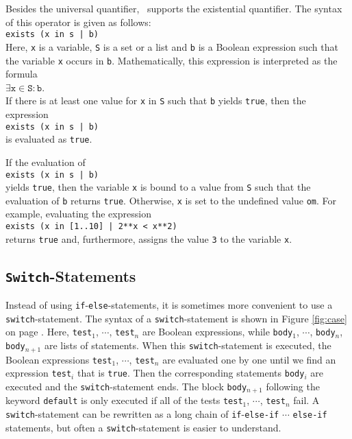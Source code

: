 Besides the universal quantifier, \setlx\ supports the existential quantifier.  The syntax of this operator is
given as follows: 
\\[0.2cm]
\hspace*{1.3cm}
\texttt{exists (x in s | b)}
\\[0.2cm]
Here, \texttt{x} is a variable, \texttt{S} is a set or a list and \texttt{b} is a Boolean expression such
that the variable \texttt{x} occurs in \texttt{b}.  Mathematically, this expression is interpreted
as the formula
\\[0.2cm]
\hspace*{1.3cm}
$\exists \mathtt{x} \in \mathtt{S} : \mathtt{b}$.
\\[0.2cm]
If there is at least one value for \texttt{x} in \texttt{S} such that \texttt{b} yields \texttt{true}, 
then the expression 
\\[0.2cm]
\hspace*{1.3cm}
\texttt{exists (x in s | b)}
\\[0.2cm]
is evaluated as \texttt{true}. 

\remarkEng
If the evaluation of
\\[0.2cm]
\hspace*{1.3cm}
\texttt{exists (x in s | b)}
\\[0.2cm]
yields \texttt{true}, then the variable \texttt{x} is bound to a value from \texttt{S} such that the
evaluation of \texttt{b} returns \texttt{true}.  Otherwise, \texttt{x} is set to the undefined value
\texttt{om}.  For example, evaluating the expression
\\[0.2cm]
\hspace*{1.3cm}
\texttt{exists (x in [1..10] | 2**x < x**2)}
\\[0.2cm]
returns \texttt{true} and, furthermore, assigns the value \texttt{3} to the variable \texttt{x}.

\subsection{\texttt{Switch}-Statements}
Instead of using \texttt{if}-\texttt{else}-statements, it is sometimes more convenient to use a
\texttt{switch}-statement. The syntax of a \texttt{switch}-statement is shown in Figure
\ref{fig:case} on page \pageref{fig:case}.  Here, 
\texttt{test}$_1$, $\cdots$, \texttt{test}$_n$ are Boolean expressions, while
\texttt{body}$_1$, $\cdots$, \texttt{body}$_n$, \texttt{body}$_{n+1}$ are lists of statements.
When this \texttt{switch}-statement is executed, the Boolean expressions
\texttt{test}$_1$, $\cdots$, \texttt{test}$_n$ are evaluated one by one until we find an expression 
\texttt{test}$_i$ that is \texttt{true}.  Then the corresponding statements \texttt{body}$_i$ are executed and
the \texttt{switch}-statement ends.   The block \texttt{body}$_{n+1}$ following the keyword \texttt{default} is
only executed if all of the tests \texttt{test}$_1$, $\cdots$, \texttt{test}$_n$ fail.
A \texttt{switch}-statement can be rewritten as a long chain of \texttt{if}-\texttt{else-if} $\cdots$
\texttt{else-if} statements, but often a \texttt{switch}-statement is easier to understand.


